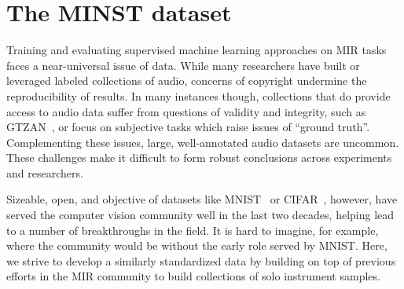 \documentclass{article}
\begin{document}
\section{The MINST dataset}




\label{minst}

Training and evaluating supervised machine learning approaches on MIR tasks faces a near-universal issue of data.
While many researchers have built or leveraged labeled collections of audio, concerns of copyright undermine the reproducibility of results.
In many instances though, collections that do provide access to audio data suffer from questions of validity and integrity, such as GTZAN~\cite{tzanetakis2002musical,sturm2012analysis}, or focus on subjective tasks which raise issues of ``ground truth''.
Complementing these issues, large, well-annotated audio datasets are uncommon.
These challenges make it difficult to form robust conclusions across experiments and researchers.

Sizeable, open, and objective of datasets like MNIST~\cite{lecun1998mnist} or CIFAR~\cite{krizhevsky2009learning}, however, have served the computer vision community well in the last two decades, helping lead to a number of breakthroughs in the field.
It is hard to imagine, for example, where the community would be without the early role served by MNIST.\@
Here, we strive to develop a similarly standardized data by building on top of previous efforts in the MIR community to build collections of solo instrument samples.
\end{document}
